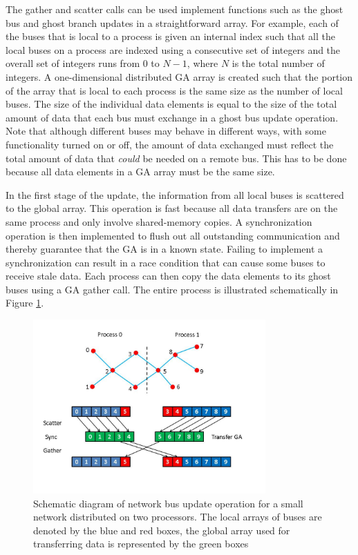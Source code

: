 \documentclass[preprint]{acm_proc_article-sp}
\begin{document}
The gather and scatter calls can be used implement functions such as the ghost
bus and ghost branch updates in a straightforward array. For example, each of
the buses that is local to a process is given an internal index such that all
the local buses on a process are indexed using a consecutive set of integers and
the overall set of integers runs from 0 to $N-1$, where $N$ is the total number
of integers. A one-dimensional distributed GA array is created such that the
portion of the array that is local to each process is the same size as the
number of local buses. The size of the individual data elements is equal to the
size of the total amount of data that each bus must exchange in a ghost bus update
operation. Note that although different buses may behave in different ways, with
some functionality turned on or off, the amount of data exchanged must reflect
the total amount of data that {\em could} be needed on a remote bus. This has to
be done because all data elements in a GA array must be the same size.

In the first stage of the update, the information from all local buses is
scattered to the global array. This operation is fast because all data transfers
are on the same process and only involve shared-memory copies. A synchronization
operation is then implemented to flush out all outstanding communication
and thereby guarantee that the GA is in a known state. Failing to implement a
synchronization can result in a race condition that can cause some buses to
receive stale data. Each process can then copy the
data elements to its ghost buses using a GA gather call. The entire process is
illustrated schematically in Figure \ref{update}.
\begin{figure}
\centering
\includegraphics[width=3.5in,keepaspectratio=true]{./FigU}
\caption{\label{update} Schematic diagram of network bus update operation for a
small network distributed on two processors. The local arrays of buses are
denoted by the blue and red boxes, the global array used for transferring data
is represented by the green boxes
}
\end{figure}
\end{document}
